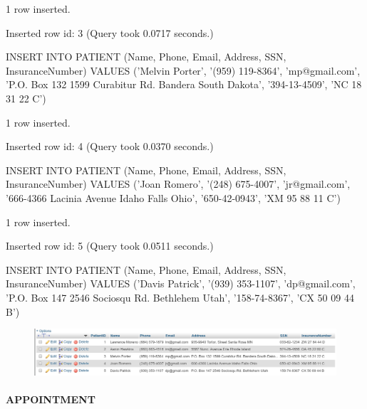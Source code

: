 \documentclass[11pt]{article}
\makeatletter
\def\maxwidth{\ifdim\Gin@nat@width>\linewidth\linewidth
    \else\Gin@nat@width\fi}
\let\Oldincludegraphics\includegraphics
\renewcommand{\includegraphics}[1]{\Oldincludegraphics[width=.8\maxwidth]{#1}}
\makeatother
\begin{document}
1 row inserted.

Inserted row id: 3 (Query took 0.0717 seconds.)

INSERT INTO PATIENT (Name, Phone, Email, Address, SSN, InsuranceNumber)
VALUES ('Melvin Porter', '(959) 119-8364', 'mp@gmail.com', 'P.O. Box 132
1599 Curabitur Rd. Bandera South Dakota', '394-13-4509', 'NC 18 31 22
C')

1 row inserted.

Inserted row id: 4 (Query took 0.0370 seconds.)

INSERT INTO PATIENT (Name, Phone, Email, Address, SSN, InsuranceNumber)
VALUES ('Joan Romero', '(248) 675-4007', 'jr@gmail.com', '666-4366
Lacinia Avenue Idaho Falls Ohio', '650-42-0943', 'XM 95 88 11 C')

1 row inserted.

Inserted row id: 5 (Query took 0.0511 seconds.)

INSERT INTO PATIENT (Name, Phone, Email, Address, SSN, InsuranceNumber)
VALUES ('Davis Patrick', '(939) 353-1107', 'dp@gmail.com', 'P.O. Box 147
2546 Sociosqu Rd. Bethlehem Utah', '158-74-8367', 'CX 50 09 44 B')

    \begin{figure}[H]
\centering
\includegraphics{patient_2.png}
\caption{}
\end{figure}

    \paragraph{APPOINTMENT}\label{appointment}
\end{document}
